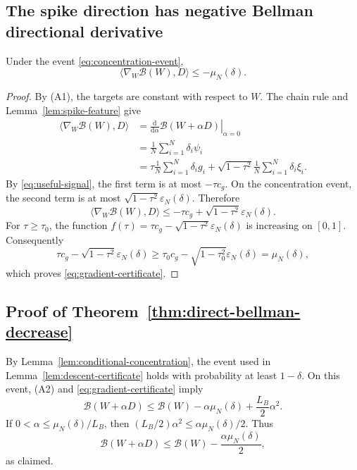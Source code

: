 \subsection{The spike direction has negative Bellman directional derivative}

\begin{lemma}
\label{lem:descent-certificate}
Under the event \eqref{eq:concentration-event},
\begin{equation}
    \langle\nabla_W\mathcal B(W),D\rangle
    \le-\mu_N(\delta).
    \label{eq:gradient-certificate}
\end{equation}
\end{lemma}

\begin{proof}
By (A1), the targets are constant with respect to $W$.  The chain rule and
Lemma~\ref{lem:spike-feature} give
\begin{align}
    \langle\nabla_W\mathcal B(W),D\rangle
    &=\left.\frac{\mathrm d}{\mathrm d\alpha}
       \mathcal B(W+\alpha D)\right|_{\alpha=0}\\
    &=\frac1N\sum_{i=1}^N\delta_i\psi_i\\
    &=\tau\frac1N\sum_{i=1}^N\delta_i g_i
      +\sqrt{1-\tau^2}\frac1N\sum_{i=1}^N\delta_i\xi_i.
\end{align}
By \eqref{eq:useful-signal}, the first term is at most $-\tau c_g$.
On the concentration event, the second term is at most
$\sqrt{1-\tau^2}\varepsilon_N(\delta)$.  Therefore
\begin{equation}
    \langle\nabla_W\mathcal B(W),D\rangle
    \le-\tau c_g+\sqrt{1-\tau^2}\varepsilon_N(\delta).
\end{equation}
For $\tau\ge\tau_0$, the function
$f(\tau)=\tau c_g-\sqrt{1-\tau^2}\varepsilon_N(\delta)$ is increasing on
$[0,1]$.  Consequently
\begin{equation}
    \tau c_g-\sqrt{1-\tau^2}\varepsilon_N(\delta)
    \ge\tau_0c_g-\sqrt{1-\tau_0^2}\varepsilon_N(\delta)
    =\mu_N(\delta),
\end{equation}
which proves \eqref{eq:gradient-certificate}.
\end{proof}

\subsection{Proof of Theorem~\ref{thm:direct-bellman-decrease}}

By Lemma~\ref{lem:conditional-concentration}, the event used in
Lemma~\ref{lem:descent-certificate} holds with probability at least
$1-\delta$.  On this event, (A2) and \eqref{eq:gradient-certificate} imply
\begin{equation}
    \mathcal B(W+\alpha D)
    \le\mathcal B(W)-\alpha\mu_N(\delta)+\frac{L_B}{2}\alpha^2.
\end{equation}
If $0<\alpha\le\mu_N(\delta)/L_B$, then
$(L_B/2)\alpha^2\le\alpha\mu_N(\delta)/2$.  Thus
\begin{equation}
    \mathcal B(W+\alpha D)
    \le\mathcal B(W)-\frac{\alpha\mu_N(\delta)}{2},
\end{equation}
as claimed.

